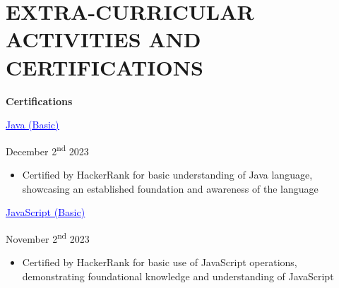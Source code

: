 \documentclass[a4paper,11pt]{article}
\begin{document}
\vspace{2pt}
\section{EXTRA-CURRICULAR ACTIVITIES AND CERTIFICATIONS}
\begin{minipage}{.65\linewidth}
    \textbf{Certifications}
\end{minipage}
 \begin{minipage}{.65\linewidth}
    \href{https://www.hackerrank.com/certificates/fbcafb873c96}{\textcolor{blue}{\uline{Java (Basic)}}}
\end{minipage}
\begin{minipage}{.34\linewidth}
    \flushright
    December 2\textsuperscript{nd} 2023
\end{minipage}
\begin{minipage}{\linewidth}
\vspace{10pt}
\begin{itemize}
    \item Certified by HackerRank for basic understanding of Java language, showcasing an established foundation and awareness of the language
\end{itemize}
\vspace{1pt}
\end{minipage}

 \begin{minipage}{.65\linewidth}
    \href{https://www.hackerrank.com/certificates/b4b9cb2f4e4a}{\textcolor{blue}{\uline{JavaScript (Basic)}}}
\end{minipage}
\begin{minipage}{.34\linewidth}
    \flushright
    November 2\textsuperscript{nd} 2023
\end{minipage}
\begin{minipage}{\linewidth}
\vspace{10pt}
\begin{itemize}
    \item Certified by HackerRank for basic use of JavaScript operations, demonstrating foundational knowledge and understanding of JavaScript 
\end{itemize}
\vspace{1pt}
\end{minipage}
\end{document}
